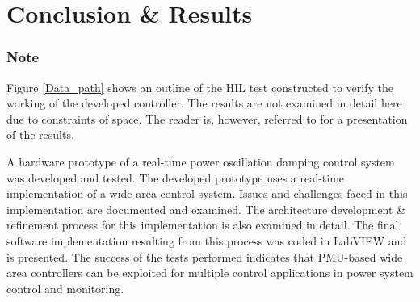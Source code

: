 \documentclass[conference]{IEEEtran}
\begin{document}
\section{Conclusion \& Results} \label{conclusion}
\subsubsection*{Note}Figure \ref{Data_path} shows an outline of the HIL test constructed to verify the working of the developed controller. The results are not examined in detail here due to constraints of space. The reader is, however, referred to \cite{Rebello} for a presentation of the results.

A hardware prototype of a real-time power oscillation damping control system was developed and tested. The developed prototype uses a real-time implementation of a wide-area control system. Issues and challenges faced in this implementation are documented and examined. The architecture development \& refinement process for this implementation is also examined in detail. The final software implementation resulting from this process was coded in LabVIEW and is presented. The success of the tests performed indicates that PMU-based wide area controllers can be exploited for multiple control applications in power system control and monitoring. %




\end{document}
